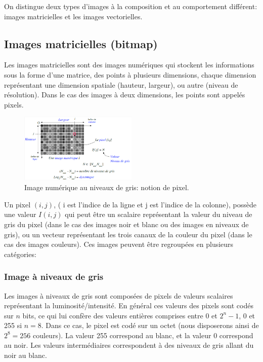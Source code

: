 On distingue deux types d'images à la composition et au comportement différent: images matricielles et les images vectorielles.

\subsection{Images matricielles (bitmap)}
Les images matricielles sont des images numériques qui stockent les informations sous la forme d'une matrice, des points à plusieurs dimensions, chaque dimension représentant une dimension spatiale (hauteur, largeur), ou autre (niveau de résolution). Dans le cas des images à deux dimensions, les points sont appelés pixels. 

\begin{figure}[H]
	\centering
	\includegraphics[width=0.5\textwidth]{Figures/pixel} 
	\caption{Image numérique au niveaux de gris: notion de pixel.}
\end{figure}


Un pixel $(i, j)$, ( i est l'indice de la ligne et j est l'indice de la colonne), possède une valeur $I(i, j)$ qui peut être un scalaire représentant la valeur du niveau de gris du pixel (dans le cas des images noir et blanc ou des images en niveaux de gris), ou un vecteur représentant les trois canaux de la couleur du pixel (dans le cas des images couleurs). Ces images peuvent être regroupées en plusieurs catégories:




\subsubsection{Image à niveaux de gris}
 Les images à niveaux de gris sont composées de pixels de valeurs scalaires représentant la luminosité/intensité. En général ces valeurs des pixels sont  codés sur $n$ bits, ce qui lui confère des valeurs entières comprises entre 0 et $2^n-1$, 0 et 255 si $n = 8$. Dans ce cas, le pixel est codé sur un octet (nous disposerons ainsi de $2^8=256$ couleurs). La valeur 255 correspond au blanc, et la valeur 0 correspond au noir. Les valeurs intermédiaires correspondent à des niveaux de gris allant du noir au blanc.\\

